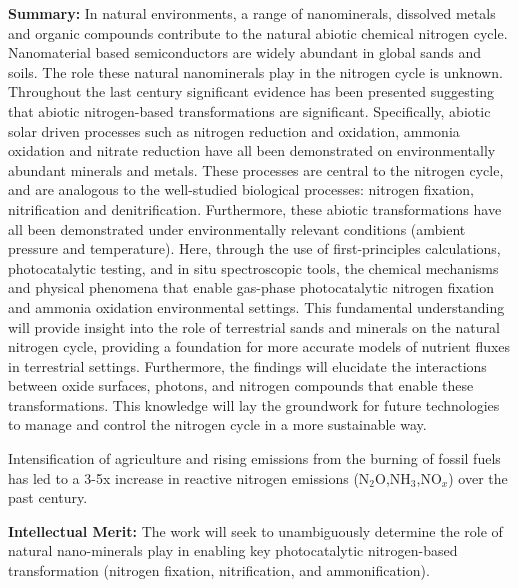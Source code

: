 \renewcommand{\LeftFooter}{Project Summary}
\renewcommand{\PageLimit}{1} %
\vspace{-15pt}

\textbf{Summary:} In natural environments, a range of nanominerals, dissolved metals and organic compounds contribute to the natural abiotic chemical nitrogen cycle. Nanomaterial based semiconductors are widely abundant in global sands and soils. The role these natural nanominerals play in the nitrogen cycle is unknown. Throughout the last century significant evidence has been presented suggesting that  abiotic nitrogen-based transformations are significant. Specifically, abiotic solar driven processes such as nitrogen reduction and oxidation, ammonia oxidation and nitrate reduction have all been demonstrated on environmentally abundant minerals and metals. These processes are central to the nitrogen cycle, and are analogous to the well-studied biological processes: nitrogen fixation, nitrification and denitrification. Furthermore, these abiotic transformations have all been demonstrated  under environmentally relevant conditions (ambient pressure and temperature).  Here, through the use of first-principles calculations, photocatalytic testing, and in situ spectroscopic tools, the chemical mechanisms and physical phenomena that enable gas-phase photocatalytic nitrogen fixation and ammonia oxidation environmental settings. This fundamental understanding will provide insight into the role of terrestrial sands and minerals on the natural nitrogen cycle, providing a foundation for more accurate models of nutrient fluxes in terrestrial settings. Furthermore, the findings will elucidate the interactions between oxide surfaces, photons, and nitrogen compounds that enable these transformations. This knowledge will lay the groundwork for future technologies to manage and control the nitrogen cycle in a more sustainable way.

Intensification of agriculture and rising emissions from the burning of fossil fuels has led to a 3-5x increase in reactive nitrogen emissions (N$_2$O,NH$_3$,NO$_x$) over the past century. 

\textbf{Intellectual Merit:} The work will seek to unambiguously determine the role of natural nano-minerals play in enabling key photocatalytic nitrogen-based transformation (nitrogen fixation, nitrification, and ammonification). 



